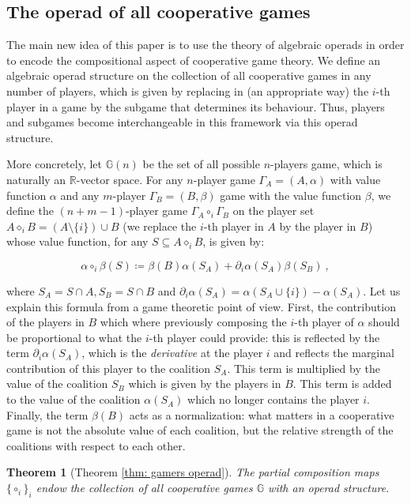 \documentclass[a4paper,12pt]{amsart}
\newtheorem{theoremintro}{Theorem}
\begin{document}
\subsection*{The operad of all cooperative games}
The main new idea of this paper is to use the theory of algebraic operads in order to encode the compositional aspect of cooperative game theory. We define an algebraic operad structure on the collection of all cooperative games in any number of players, which is given by replacing in (an appropriate way) the $i$-th player in a game by the subgame that determines its behaviour. Thus, players and subgames become interchangeable in this framework via this operad structure. 

\medskip

More concretely, let $\mathbb{G}(n)$ be the set of all possible $n$-players game, which is naturally an $\mathbb{R}$-vector space. For any $n$-player game $\Gamma_A = (A, \alpha)$ with value function $\alpha$ and any $m$-player $\Gamma_B = (B,\beta)$ game with the value function $\beta$, we define the $(n+m-1)$-player game $\Gamma_A \circ_i \Gamma_B$ on the player set $A \diamond_i B = (A \setminus \{i\}) \cup B$ (we replace the $i$-th player in $A$ by the player in $B$) whose value function, for any $S \subseteq A \diamond_i B$, is given by: 

\[
\alpha \circ_i \beta(S) \coloneqq \beta(B)\alpha(S_A) + \partial_i \alpha(S_A) \beta(S_B)~, 
\]
\vspace{0.1pc}

where $S_A = S \cap A, S_B = S \cap B$ and $\partial_i \alpha(S_A) = \alpha(S_A \cup \{i\}) - \alpha(S_A)$. Let us explain this formula from a game theoretic point of view. First, the contribution of the players in $B$ which where previously composing the $i$-th player of $\alpha$ should be proportional to what the $i$-th player could provide: this is reflected by the term $\partial_i \alpha(S_A)$, which is the \textit{derivative} at the player $i$ and reflects the marginal contribution of this player to the coalition $S_A$. This term is multiplied by the value of the coalition $S_B$ which is given by the players in $B$. This term is added to the value of the coalition $\alpha(S_A)$ which no longer contains the player $i$. Finally, the term $\beta(B)$ acts as a normalization: what matters in a cooperative game is not the absolute value of each coalition, but the relative strength of the coalitions with respect to each other. 

\begin{theoremintro}[Theorem \ref{thm: gamers operad}]
The partial composition maps $\{\circ_i\}_i$ endow the collection of all cooperative games $\mathbb{G}$ with an operad structure.
\end{theoremintro}
\end{document}
